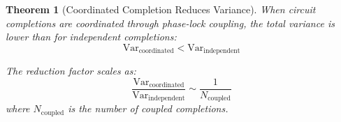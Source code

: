 \documentclass[12pt,a4paper]{article}
\newtheorem{theorem}{Theorem}
\begin{document}
\begin{theorem}[Coordinated Completion Reduces Variance]
\label{thm:coordinated_completion}
When circuit completions are \textit{coordinated} through phase-lock coupling, the total variance is lower than for independent completions:
\begin{equation}
\text{Var}_{\text{coordinated}} < \text{Var}_{\text{independent}}
\end{equation}

The reduction factor scales as:
\begin{equation}
\frac{\text{Var}_{\text{coordinated}}}{\text{Var}_{\text{independent}}} \sim \frac{1}{N_{\text{coupled}}}
\end{equation}
where $N_{\text{coupled}}$ is the number of coupled completions.
\end{theorem}
\end{document}

